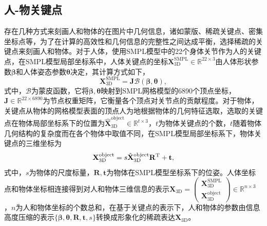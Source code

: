 \subsection{人-物关键点}
存在几种方式来刻画人和物体的在图片中几何信息，诸如蒙版、稀疏关键点、密集坐标点等，为了在计算的高效性和几何信息的完整性之间达成平衡，选择稀疏的关键点来刻画人和物体。对于人体，使用SMPL模型中的22个身体关节作为人的关键点，在SMPL模型局部坐标系中，人体关键点的坐标$\mathbf{X}_{\text{3D}}^{\text{SMPL}}\in\mathbb{R}^{22 \times 3}$由人体形状参数$\mathbf{\beta}$和人体姿态参数$\mathbf{\theta}$决定，其计算方式如下，
\begin{equation}\label{eq:smpl-joints}
	\mathbf{X}_{\text{3D}}^{\text{SMPL}} = \mathbf{J}\mathcal{B}(\mathbf{\beta}, \mathbf{\theta}),
\end{equation}
式中，$\mathcal{B}$为蒙皮函数，它将$\mathbf{\beta},\mathbf{\theta}$映射到SMPL网格模型的6890个顶点坐标，$\mathbf{J}\in\mathbb{R}^{22 \times 6890}$为节点权重矩阵，它衡量各个顶点对关节点的贡献程度。对于物体，关键点从物体的网格模型表面的顶点人为地根据物体的几何特征选取，选取的关键点在物体局部坐标系下的位置为$\hat{\mathbf{X}}_{\text{3D}}^{\text{object}} \in \mathbb{R}^{t\times 3}$，$t$为物体关键点的个数，$t$随着物体几何结构的复杂度而在各个物体中取值不同，在SMPL模型局部坐标系下，物体关键点的三维坐标为
\begin{equation}\label{eq:object-kps}
	\mathbf{X}_{\text{3D}}^{\text{object}} = s\hat{\mathbf{X}}_{\text{3D}}^{\text{object}} \mathbf{R}^{\rm{T}} + \mathbf{t},
\end{equation}
式中，$s$为物体的尺度标量，$\mathbf{R},\mathbf{t}$为物体在SMPL模型坐标系下的位姿。人体坐标点和物体坐标相连接得到对人和物体三维信息的表示$\mathbf{X}_{\text{3D}} = \left(\begin{matrix} \mathbf{X}_{\text{3D}}^{\text{SMPL}} \\ \mathbf{X}_{\text{3D}}^{\text{object}} \end{matrix} \right) \in \mathbb{R}^{n\times3}$，$n$为人和物体坐标的个数总和，在基于关键点的表示下，人和物体的参数由信息高度压缩的表示$\{\mathbf{\beta}, \mathbf{\theta}, \mathbf{R}, \mathbf{t}, s\}$转换成形象化的稀疏表达$\mathbf{X}_{\text{3D}}$。


